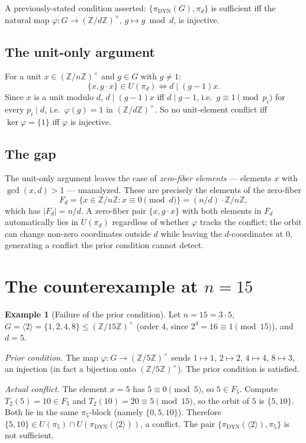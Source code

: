 \documentclass[11pt,reqno]{amsart}
\theoremstyle{plain}
\theoremstyle{definition}
\newtheorem{example}[theorem]{Example}
\newcommand{\Z}{\mathbb{Z}}
\newcommand{\Zn}{\Z/n\Z}
\newcommand{\Zns}{(\Z/n\Z)^{\times}}
\newcommand{\DYN}{\mathrm{DYN}}
\begin{document}
A previously-stated condition asserted: $\{\pi_{\DYN}(G), \pi_d\}$ is sufficient iff the natural map $\varphi \colon G \to (\Z/d\Z)^{\times}$, $g \mapsto g \bmod d$, is injective.

\subsection{The unit-only argument}

For a unit $x \in \Zns$ and $g \in G$ with $g \neq 1$:
\[
\{x, g \cdot x\} \in U(\pi_d) \iff d \mid (g-1) x.
\]
Since $x$ is a unit modulo $d$, $d \mid (g-1) x$ iff $d \mid g - 1$, i.e.\ $g \equiv 1 \pmod{p_i}$ for every $p_i \mid d$, i.e.\ $\varphi(g) = 1$ in $(\Z/d\Z)^{\times}$. So no unit-element conflict iff $\ker \varphi = \{1\}$ iff $\varphi$ is injective.

\subsection{The gap}

The unit-only argument leaves the case of \emph{zero-fiber elements} --- elements $x$ with $\gcd(x,d) > 1$ --- unanalyzed. These are precisely the elements of the zero-fiber
\[
F_d = \{x \in \Zn : x \equiv 0 \pmod d\} = (n/d) \cdot \Zn,
\]
which has $|F_d| = n/d$. A zero-fiber pair $\{x, g \cdot x\}$ with both elements in $F_d$ automatically lies in $U(\pi_d)$ regardless of whether $\varphi$ tracks the conflict; the orbit can change non-zero coordinates outside $d$ while leaving the $d$-coordinates at $0$, generating a conflict the prior condition cannot detect.

\section{The counterexample at $n = 15$}

\begin{example}[Failure of the prior condition] \label{ex:n15}
Let $n = 15 = 3 \cdot 5$, $G = \langle 2 \rangle = \{1,2,4,8\} \leq (\Z/15\Z)^{\times}$ (order $4$, since $2^4 = 16 \equiv 1 \pmod{15}$), and $d = 5$.

\emph{Prior condition.} The map $\varphi \colon G \to (\Z/5\Z)^{\times}$ sends $1 \mapsto 1$, $2 \mapsto 2$, $4 \mapsto 4$, $8 \mapsto 3$, an injection (in fact a bijection onto $(\Z/5\Z)^{\times}$). The prior condition is satisfied.

\emph{Actual conflict.} The element $x = 5$ has $5 \equiv 0 \pmod 5$, so $5 \in F_5$. Compute $T_2(5) = 10 \in F_5$ and $T_2(10) = 20 \equiv 5 \pmod{15}$, so the orbit of $5$ is $\{5,10\}$. Both lie in the same $\pi_5$-block (namely $\{0,5,10\}$). Therefore $\{5,10\} \in U(\pi_5) \cap U(\pi_{\DYN}(\langle 2 \rangle))$, a conflict. The pair $\{\pi_{\DYN}(\langle 2 \rangle), \pi_5\}$ is not sufficient.
\end{example}
\end{document}
